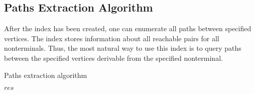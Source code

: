 \subsection{Paths Extraction Algorithm}
After the index has been created, one can enumerate all paths between specified vertices.
The index stores information about all reachable pairs for all nonterminals.
Thus, the most natural way to use this index is to query paths between the specified vertices derivable from the specified nonterminal.
\begin{algorithm}[h]
\begin{algorithmic}[1]
\footnotesize
\caption{Paths extraction algorithm}
\label{tensor:pathsExtraction}

\State \Return $res$
\EndFunction





\end{algorithmic}
\end{algorithm}
